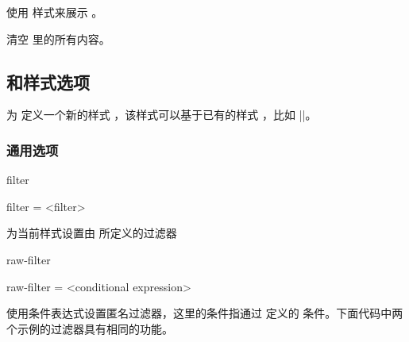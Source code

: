 \documentclass[full]{l3doc}
\begin{document}
\begin{documentation}
\begin{function}[added=2022-01-05]{\dbshow}
  \begin{syntax}
      
  \end{syntax}

  使用  样式来展示 。
\end{function}

\begin{function}[added=2022-01-07]{\dbclear}
  \begin{syntax}
     
  \end{syntax}
  清空  里的所有内容。
\end{function}

\subsection{ 和样式选项}

\begin{function}[added=2022-01-05]{\dbNewStyle}
  \begin{syntax}
        
  \end{syntax}

  为  定义一个新的样式 ，该样式可以基于已有的样式
  ，比如 ||。
\end{function}

\subsubsection{通用选项}

\begin{option}[added=2022-01-05]{filter}
  \begin{syntax}
    filter = <filter>
  \end{syntax}

  为当前样式设置由  所定义的过滤器
\end{option}

\begin{option}[added=2022-01-06]{raw-filter}
  \begin{syntax}
    raw-filter = <conditional expression>
  \end{syntax}

  使用条件表达式设置匿名过滤器，这里的条件指通过  定义的
  条件。下面代码中两个示例的过滤器具有相同的功能。
\end{option}


\end{documentation}
\end{document}
